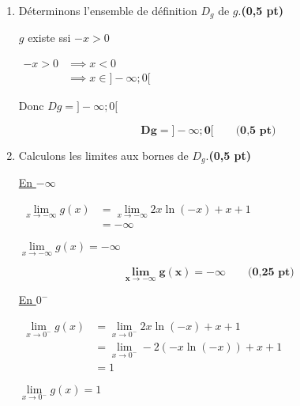 \documentclass[12pt,a4paper]{article}
\begin{document}
\begin{enumerate}
    \item Déterminons l’ensemble de définition \( D_g \) de \( g \).\hfill \textbf{(0,5 pt)}

          \(g\) existe ssi \(-x>0\)

          \(\begin{aligned}
              -x>0 & \implies x<0              \\
                   & \implies x\in ]-\infty;0[
          \end{aligned}\)

          Donc \(Dg=]-\infty;0[\)

          \begin{resultbox}
              \[
                  \mathbf{Dg=]-\infty;0[}\quad\quad\textbf{(0,5 pt)}
              \]
          \end{resultbox}

    \item Calculons les limites aux bornes de \( D_g \).\hfill \textbf{(0,5 pt)}

          \underline{En $-\infty$}

          \( \begin{aligned}
              \lim\limits_{x\to -\infty}g(x) & =\lim\limits_{x\to -\infty} 2x \ln(-x) + x + 1 \\
                                             & =-\infty
          \end{aligned} \)

          \( \lim\limits_{x\to -\infty}g(x) = -\infty \)

          \begin{resultbox}
              \[
                  \mathbf{\lim\limits_{x\to -\infty}g(x) = -\infty}\quad\quad\textbf{(0,25 pt)}
              \]
          \end{resultbox}

          \underline{En $0^{-}$}

          \( \begin{aligned}
              \lim\limits_{x\to 0^{-}}g(x) & =\lim\limits_{x\to 0^{-}} 2x \ln(-x) + x + 1     \\
                                           & =\lim\limits_{x\to 0^{-}} -2(-x \ln(-x)) + x + 1 \\
                                           & =1
          \end{aligned} \)

          \( \lim\limits_{x\to 0^{-}}g(x) = 1 \)


\end{enumerate}
\end{document}
